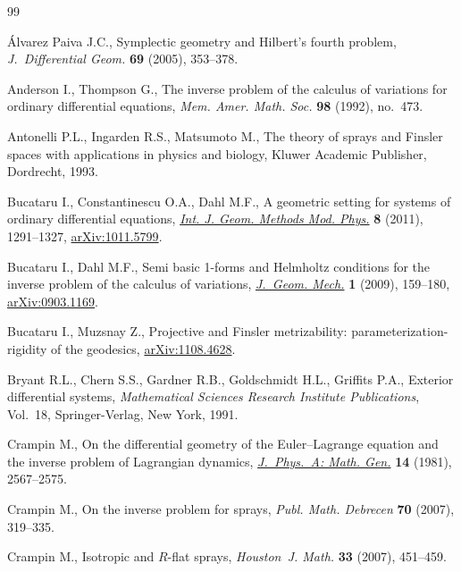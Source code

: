 \begin{thebibliography}{99}

\footnotesize\itemsep=0pt

\'Alvarez Paiva J.C.,
Symplectic geometry and Hilbert's fourth problem,
{\it J.~Differential Geom.} {\bf 69} (2005), 353--378.

Anderson I., Thompson G.,
The inverse problem of the calculus of variations for ordinary dif\/ferential equations,
{\it Mem. Amer. Math. Soc.} {\bf 98} (1992),  no.~473.

Antonelli P.L., Ingarden  R.S., Matsumoto M.,
The theory of sprays and Finsler spaces with applications in physics and biology,
Kluwer Academic Publisher, Dordrecht, 1993.

Bucataru I., Constantinescu O.A., Dahl M.F.,
A geometric setting for systems of ordinary dif\/ferential equations,
\href{http://dx.doi.org/10.1142/S0219887811005701}{{\it Int. J. Geom. Methods Mod. Phys.}} {\bf 8} (2011), 1291--1327,
\href{http://arxiv.org/abs/1011.5799}{arXiv:1011.5799}.

Bucataru I., Dahl M.F.,
Semi basic 1-forms and Helmholtz conditions for the inverse problem of the calculus of variations,
\href{http://dx.doi.org/10.3934/jgm.2009.1.159}{{\it J.~Geom. Mech.}}  {\bf 1} (2009), 159--180,
\href{http://arxiv.org/abs/0903.1169}{arXiv:0903.1169}.

Bucataru I., Muzsnay Z.,
Projective and Finsler metrizability: parameterization-rigidity of the geodesics,
\href{http://arxiv.org/abs/1108.4628}{arXiv:1108.4628}.

Bryant R.L., Chern S.S.,  Gardner R.B., Goldschmidt H.L., Grif\/f\/its P.A.,
Exterior dif\/ferential systems, {\it Mathematical Sciences Research Institute Publications}, Vol.~18, Springer-Verlag, New York, 1991.

Crampin M.,
On the dif\/ferential geometry  of the Euler--Lagrange equation and the inverse problem of Lagrangian dynamics,
\href{http://dx.doi.org/10.1088/0305-4470/14/10/012}{{\it  J.~Phys.~A: Math. Gen.}} {\bf 14} (1981), 2567--2575.

Crampin M.,
On the inverse problem for sprays,
{\it Publ. Math. Debrecen} {\bf 70}  (2007), 319--335.

Crampin M.,
Isotropic and $R$-f\/lat sprays,
{\it Houston~J. Math.}  {\bf 33} (2007), 451--459.


\end{thebibliography}

